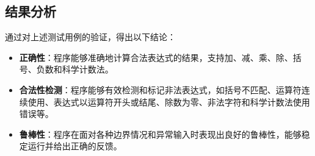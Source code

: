 \documentclass{article}
\begin{document}
    \subsection{结果分析}
    通过对上述测试用例的验证，得出以下结论：
    \begin{itemize}
        \item \textbf{正确性}：程序能够准确地计算合法表达式的结果，支持加、减、乘、除、括号、负数和科学计数法。
        \item \textbf{合法性检测}：程序能够有效检测和标记非法表达式，如括号不匹配、运算符连续使用、表达式以运算符开头或结尾、除数为零、非法字符和科学计数法使用错误等。
        \item \textbf{鲁棒性}：程序在面对各种边界情况和异常输入时表现出良好的鲁棒性，能够稳定运行并给出正确的反馈。
    \end{itemize}
\end{document}
